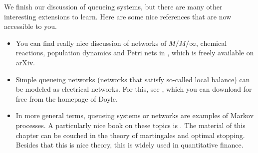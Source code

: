 We finish our discussion of queueing systems, but there are many other interesting extensions to learn. Here are some nice  references that are now accessible to you. 
\begin{itemize}
\item You can find  really nice discussion of networks of $M/M/\infty$, chemical reactions, population dynamics and Petri nets in \cite{baez2012quantum}, which is freely available on arXiv.
\item Simple queueing networks (networks that satisfy so-called local balance) can be modeled as electrical networks.
  For this, see \cite{doyle84:_random_walks_elect_networ}, which you can download for free from the homepage of Doyle.
\item In more general terms, queueing systems or networks are examples of Markov processes.
  A particularly nice book on these topics is \cite{norris97:_markov_chain}.
  The material of this chapter can be couched in the theory of martingales and optimal stopping.
  Besides that this is nice theory, this is widely used in quantitative finance.
\end{itemize}






